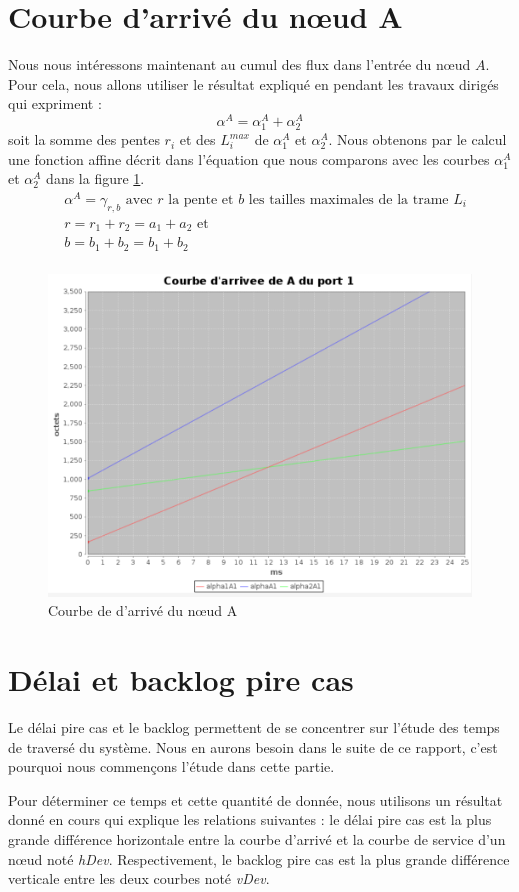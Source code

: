 \section{Courbe d'arrivé du nœud A}
Nous nous intéressons maintenant au cumul des flux dans l'entrée du nœud $A$. Pour cela, nous allons utiliser le résultat expliqué en pendant les travaux dirigés qui expriment : 
\begin{equation}
\alpha^A = \alpha_1^A + \alpha_2^A
\end{equation}
soit la somme des pentes $r_i$ et des $L_i^{max}$ de $\alpha_1^A$ et $\alpha_2^A$. Nous obtenons par le calcul une fonction affine décrit dans l'équation  que nous comparons avec les courbes $\alpha_1^A$ et $\alpha_2^A$ dans la figure \ref{fig:arriveA}.
\begin{align}\label{eqn:arriveA}
&\alpha^A = \gamma_{r,b} \text{ avec $r$ la pente et $b$ les tailles maximales de la trame $L_i$}\\
&r = r_1 + r_2 = a_1 + a_2\text{ et } \\
&b = b_1 + b_2 = b_1 + b_2\\
\end{align}
\begin{figure}[!ht]
\centering
\includegraphics[width = .6\textwidth]{./I/images/arrive_general.png}
\caption{\label{fig:arriveA}Courbe de d'arrivé du nœud A}
\end{figure} 

\section{Délai et backlog pire cas}
Le délai pire cas et le backlog permettent de se concentrer sur l'étude des temps de traversé du système. Nous en aurons besoin dans le suite de ce rapport, c'est pourquoi nous commençons l'étude dans cette partie.

Pour déterminer ce temps et cette quantité de donnée, nous utilisons un résultat donné en cours qui explique les relations suivantes : le délai pire cas est la plus grande différence horizontale entre la courbe d'arrivé et la courbe de service d'un nœud noté \emph{hDev}. Respectivement, le backlog pire cas est la plus grande différence verticale entre les deux courbes noté \emph{vDev}. 

